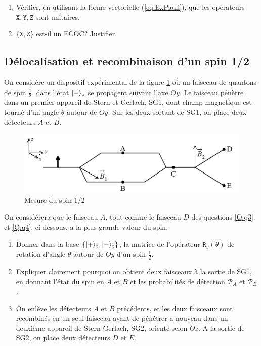 {\begin{enumerate}
\item Vérifier, en utilisant la forme vectorielle (\ref{eq:ExPauli}), que les
opérateurs $\mathtt{X},\mathtt{Y},\mathtt{Z}$ sont unitaires.

\item $\{\mathtt{X},\mathtt{Z}\}$ est-il un ECOC? Justifier.
\end{enumerate}

\subsection{Délocalisation et recombinaison d'un spin 1/2}

On considère un dispositif expérimental de la figure \ref{fig:MesureSpinEx2011}
où un faisceau de quantons de spin $\frac{1}{2}$, dans l'état $\vert+\rangle_{z}$ se
propagent suivant l'axe $Oy$. Le faisceau pénètre dans un premier appareil de
Stern et Gerlach, SG1, dont champ magnétique est tourné d'un angle $\theta$
autour de $Oy$. Sur les deux sortant de SG1, on place deux détecteurs $A$ et
$B$.

\begin{figure}[htpb]
\centering
\includegraphics{graphics/SpinREXMQ2005.pdf}
\caption{Mesure du spin 1/2}
\label{fig:MesureSpinEx2011}
\end{figure}

On considérera que le faisceau $A$, tout comme le faisceau $D$ des questions
\ref{Q:q3}. et \ref{Q:q4}. ci-dessous, a la plus grande valeur du spin.

\begin{enumerate}
\item  Donner dans la base $\{\vert+\rangle_{z},\vert-\rangle_{z}\}$, la matrice de
l'opérateur $\mathtt{R}_{y}(\theta)$ de rotation d'angle $\theta$ autour de $Oy$
d'un spin $\frac{1}{2}$.

\item Expliquer clairement pourquoi on obtient deux faisceaux à la sortie de
SG1, en donnant l'état du spin en $A$ et $B$ et les probabilités de détection
$\mathcal{P}_{A}$ et $\mathcal{P}_{B}$.

\item\label{Q:q3} On enlève les détecteurs $A$ et $B$ précédents, et les deux
faisceaux sont recombinés en un seul faisceau avant de pénétrer à nouveau dans
un deuxième appareil de Stern-Gerlach, SG2, orienté selon $Oz$. A la sortie de
SG2, on place deux détecteurs $D$ et $E$.


\end{enumerate}}

